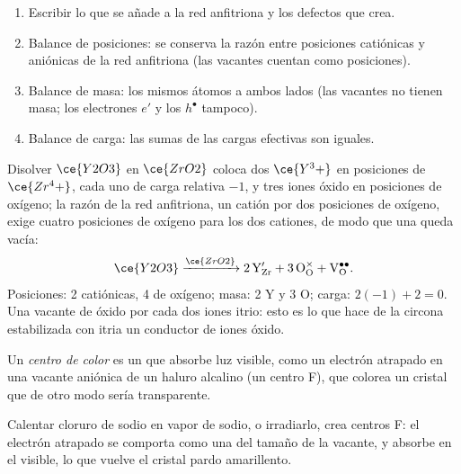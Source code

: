 \begin{method}\label{met:b3:solid-state:kroger-vink}
\begin{enumerate}
  \item Escribir lo que se añade a la red anfitriona y los defectos que crea.
  \item Balance de posiciones: se conserva la razón entre posiciones catiónicas y aniónicas de la red anfitriona
        (las vacantes cuentan como posiciones).
  \item Balance de masa: los mismos átomos a ambos lados (las vacantes no tienen masa;
        los electrones $e'$ y los  $h^\bullet$ tampoco).
  \item Balance de carga: las sumas de las cargas efectivas son iguales.
\end{enumerate}
\end{method}

\begin{example}
Disolver $\ce{Y2O3}$ en $\ce{ZrO2}$ coloca dos $\ce{Y^3+}$ en posiciones de $\ce{Zr^4+}$, cada uno de carga relativa $-1$, y
tres iones óxido en posiciones de oxígeno; la razón de la red anfitriona, un catión por dos posiciones de
oxígeno, exige cuatro posiciones de oxígeno para los dos cationes, de modo que una queda vacía:
\[
  \ce{Y2O3} \xrightarrow{\ce{ZrO2}} \mathrm{2\,Y_{Zr}' + 3\,O_O^{\times} + V_O^{\bullet\bullet}}.
\]
Posiciones: 2 catiónicas, 4 de oxígeno; masa: 2 Y y 3 O; carga: $2(-1) + 2 = 0$. Una vacante
de óxido por cada dos iones itrio: esto es lo que hace de la circona estabilizada con itria
un conductor de iones óxido.
\end{example}

\begin{definition}\label{def:b3:solid-state:colour-centre}
Un \emph{centro de color} es un  que absorbe
luz visible, como un electrón atrapado en una vacante aniónica de un haluro
alcalino (un centro F), que colorea un cristal que de otro modo sería transparente.
\end{definition}

Calentar cloruro de sodio en vapor de sodio, o irradiarlo, crea centros F: el
electrón atrapado se comporta como una  del tamaño de la vacante, y
absorbe en el visible, lo que vuelve el cristal pardo amarillento.

